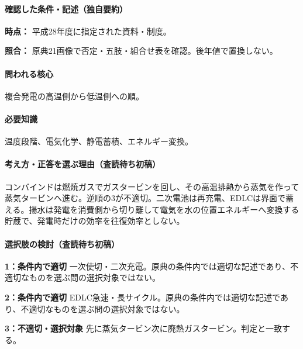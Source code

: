 \paragraph{確認した条件・記述（独自要約）}\mbox{}\par

\noindent\textbf{時点：} 平成28年度に指定された資料・制度。\par

\noindent\textbf{照合：} 原典21画像で否定・五肢・組合せ表を確認。後年値で置換しない。\par

\paragraph{問われる核心} 複合発電の高温側から低温側への順。

\paragraph{必要知識} 温度段階、電気化学、静電蓄積、エネルギー変換。

\paragraph{考え方・正答を選ぶ理由（査読待ち初稿）} コンバインドは燃焼ガスでガスタービンを回し、その高温排熱から蒸気を作って蒸気タービンへ進む。逆順の3が不適切。二次電池は再充電、EDLCは界面で蓄える。揚水は発電を消費側から切り離して電気を水の位置エネルギーへ変換する貯蔵で、発電時だけの効率を往復効率としない。

\paragraph{選択肢の検討（査読待ち初稿）}\mbox{}\par

\noindent\textbf{1：条件内で適切} 一次使切・二次充電。原典の条件内では適切な記述であり、不適切なものを選ぶ問の選択対象ではない。\par

\noindent\textbf{2：条件内で適切} EDLC急速・長サイクル。原典の条件内では適切な記述であり、不適切なものを選ぶ問の選択対象ではない。\par

\noindent\textbf{3：不適切・選択対象} 先に蒸気タービン次に廃熱ガスタービン。判定と一致する。\par

